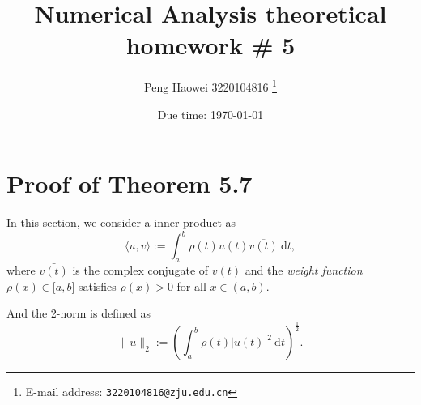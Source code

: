 \documentclass[a4paper]{article}
\begin{document}
\title{\textbf{Numerical Analysis theoretical homework \# 5}}

\author{Peng Haowei 3220104816
  \thanks{E-mail address: \texttt{3220104816@zju.edu.cn}}}

\date{Due time: \today}

\maketitle

\section{Proof of Theorem 5.7}

In this section, we consider a inner product as 
\begin{equation}
    \langle u, v\rangle := \int_a^b \rho(t) u(t) \overline{v(t)}\ \mathrm{d}t,
    \label{eq:1_inner_product}
\end{equation}
where $\bar{v(t)}$ is the complex conjugate of $v(t)$ and the \textit{weight function} $\rho(x) \in \mathcal[a, b]$ satisfies $\rho(x) > 0$ for all $x \in (a, b)$.

And the 2-norm is defined as
\begin{equation}
    \|u\|_2 := \left(\int_a^b \rho(t) |u(t)|^2\ \mathrm{d}t\right)^{\frac{1}{2}}.
    \label{eq:1_2_norm}
\end{equation}
\end{document}
